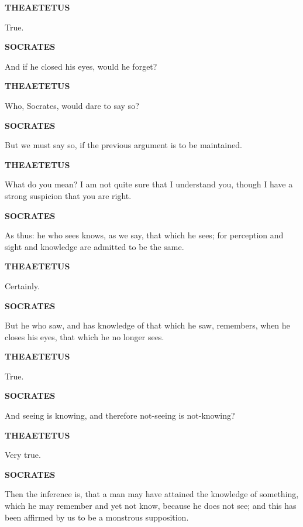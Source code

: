 \documentclass[11pt,letter]{article}
\begin{document}
\par \textbf{THEAETETUS}
\par   True.

\par \textbf{SOCRATES}
\par   And if he closed his eyes, would he forget?

\par \textbf{THEAETETUS}
\par   Who, Socrates, would dare to say so?

\par \textbf{SOCRATES}
\par   But we must say so, if the previous argument is to be maintained.

\par \textbf{THEAETETUS}
\par   What do you mean? I am not quite sure that I understand you, though I have a strong suspicion that you are right.

\par \textbf{SOCRATES}
\par   As thus:  he who sees knows, as we say, that which he sees; for perception and sight and knowledge are admitted to be the same.

\par \textbf{THEAETETUS}
\par   Certainly.

\par \textbf{SOCRATES}
\par   But he who saw, and has knowledge of that which he saw, remembers, when he closes his eyes, that which he no longer sees.

\par \textbf{THEAETETUS}
\par   True.

\par \textbf{SOCRATES}
\par   And seeing is knowing, and therefore not-seeing is not-knowing?

\par \textbf{THEAETETUS}
\par   Very true.

\par \textbf{SOCRATES}
\par   Then the inference is, that a man may have attained the knowledge of something, which he may remember and yet not know, because he does not see; and this has been affirmed by us to be a monstrous supposition.
\end{document}
